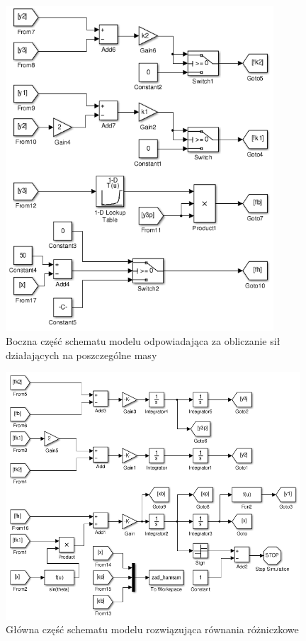 \documentclass[12pt]{article}
\begin{document}
\begin{figure}[!htb]
	\begin{center}
		\includegraphics[width=10cm]{../res/img/zad_hamsam_mdl_side.png}
	\end{center} 
	\caption{Boczna część schematu modelu odpowiadająca za obliczanie sił
	działających na poszczególne masy}
	\label{rys:zad_hamsam_mdl_side}
\end{figure}

\newpage

\begin{figure}[!htb]
	\begin{center}
		\includegraphics[width=11cm]{../res/img/zad_hamsam_mdl_main.png}
	\end{center} 
	\caption{Główna część schematu modelu rozwiązująca równania
	różniczkowe}
	\label{rys:zad_hamsam_mdl_main}
\end{figure}
\end{document}
